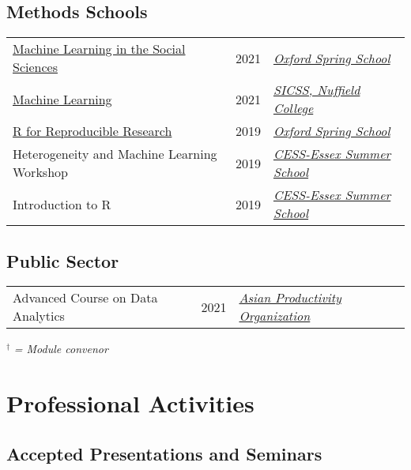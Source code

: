\documentclass[11pt, a4paper]{article}
\begin{document}
  \subsection*{Methods Schools}
  \begin{tabular}{p{}p{}p{}}
      \href{https://github.com/tsrobinson/ox_ML}{Machine Learning in the Social Sciences} & 2021 & \textit{\href{https://www.politics.ox.ac.uk/spring-school/spring-school.html}{Oxford Spring School}} \\
      \href{https://github.com/tsrobinson/ML_SICSS21}{Machine Learning} & 2021 & \textit{\href{https://sicss.io/2021/oxford/}{SICSS, Nuffield College}} \\
      \href{https://github.com/tsrobinson/r_for_reproducible_research}{R for Reproducible Research} & 2019 & \textit{\href{https://www.politics.ox.ac.uk/spring-school/spring-school.html}{Oxford Spring School}} \\
      Heterogeneity and Machine Learning Workshop & 2019 & \textit{\href{https://cess-nuffield.nuff.ox.ac.uk/2019-cess-essex-summer-school/}{CESS-Essex Summer School}} \\
      Introduction to R & 2019 & \textit{\href{https://cess-nuffield.nuff.ox.ac.uk/2019-cess-essex-summer-school/}{CESS-Essex Summer School}} \\
  \end{tabular}
    \vspace{-1em}

  \subsection*{Public Sector}
 \begin{tabular}{p{}p{}p{}}
      Advanced Course on Data Analytics & 2021 & \textit{\href{https://www.apo-tokyo.org/}{Asian Productivity Organization}} \\
 \end{tabular}
   \vspace{-1em}

  \vspace{1em}$^\dagger$ \textit{= Module convenor}

 \section*{Professional Activities}


 \subsection*{Accepted Presentations and Seminars}
\end{document}

